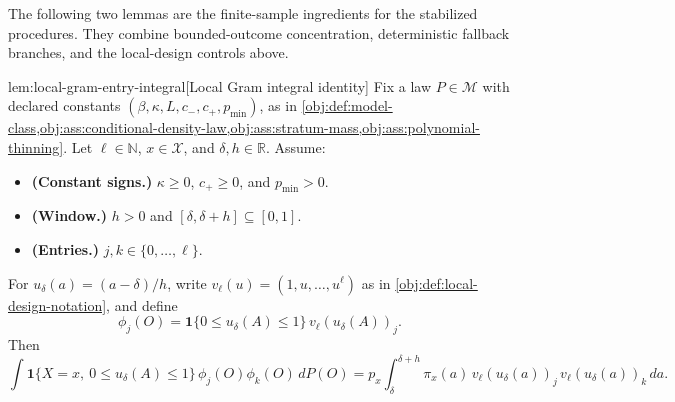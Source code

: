 \documentclass[11pt]{article}
\begin{document}
The following two lemmas are the finite-sample ingredients for the stabilized procedures. They combine bounded-outcome concentration, deterministic fallback branches, and the local-design controls above.

\begin{lemmav}{lem:local-gram-entry-integral}[Local Gram integral identity]
Fix a law \(P\in\mathcal M\) with declared constants \((\beta,\kappa,L,c_-,c_+,p_{\min})\), as in \cref{obj:def:model-class,obj:ass:conditional-density-law,obj:ass:stratum-mass,obj:ass:polynomial-thinning}.  Let \(\ell\in\mathbb N\), \(x\in\mathcal X\), and \(\delta,h\in\mathbb R\).  Assume:
\begin{itemize}
\item \textbf{(Constant signs.)} \(\kappa\ge 0\), \(c_+\ge 0\), and \(p_{\min}>0\).
\item \textbf{(Window.)} \(h>0\) and \([\delta,\delta+h]\subseteq[0,1]\).
\item \textbf{(Entries.)} \(j,k\in\{0,\ldots,\ell\}\).
\end{itemize}
For \(u_\delta(a)=(a-\delta)/h\), write \(v_\ell(u)=(1,u,\ldots,u^\ell)\) as in \cref{obj:def:local-design-notation}, and define
\[
\phi_j(O)=\mathbf 1\{0\le u_\delta(A)\le 1\}\,v_\ell(u_\delta(A))_j .
\]
Then
\[
\int \mathbf 1\{X=x,\ 0\le u_\delta(A)\le 1\}\,\phi_j(O)\phi_k(O)\,dP(O)
=
p_x\int_{\delta}^{\delta+h}
\pi_x(a)\,
v_\ell(u_\delta(a))_j\,
v_\ell(u_\delta(a))_k\,da .
\]
\end{lemmav}
\end{document}
